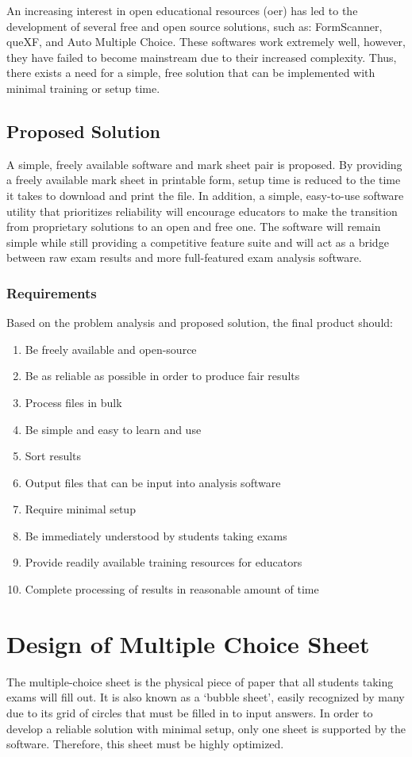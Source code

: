 \documentclass[12pt, letterpaper]{report}
\begin{document}
An increasing interest in open educational resources (\ac{oer}) has led to the
development of several free and open source solutions, such as: FormScanner,
queXF, and Auto Multiple Choice. These softwares work extremely well, however,
they have failed to become mainstream due to their increased complexity. Thus,
there exists a need for a simple, free solution that can be implemented with
minimal training or setup time.
\section{Proposed Solution}
A simple, freely available software and mark sheet pair is proposed. By
providing a freely available mark sheet in printable form, setup time is reduced
to the time it takes to download and print the file. In addition, a simple,
easy-to-use software utility that prioritizes reliability will encourage
educators to make the transition from proprietary solutions to an open and free
one. The software will remain simple while still providing a competitive feature
suite and will act as a bridge between raw exam results and more full-featured
exam analysis software.
\subsection{Requirements}
Based on the problem analysis and proposed solution, the final product should:

\begin{enumerate}
  \item Be freely available and open-source
  \item Be as reliable as possible in order to produce fair results
  \item Process files in bulk
  \item Be simple and easy to learn and use
  \item Sort results
  \item Output files that can be input into analysis software
  \item Require minimal setup
  \item Be immediately understood by students taking exams
  \item Provide readily available training resources for educators
  \item Complete processing of results in reasonable amount of time
\end{enumerate}


\chapter{Design of Multiple Choice Sheet}
The multiple-choice sheet is the physical piece of paper that all students
taking exams will fill out. It is also known as a `bubble sheet', easily recognized
by many due to its grid of circles that must be filled in to input answers. In order to
develop a reliable solution with minimal setup, only one sheet is supported
by the software. Therefore, this sheet must be highly optimized.
\end{document}
